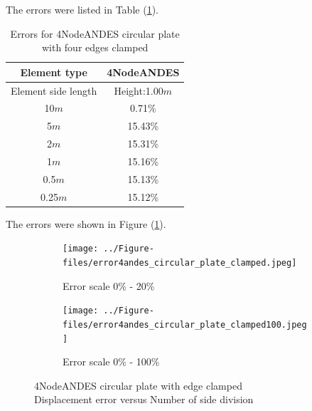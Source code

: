 \documentclass[fleqn,11pt]{article}
\begin{document}
The errors were listed in Table (\ref{table errors for 4NodeANDES circular plate with four edges clamped}).

\begin{table}[H]
  \centering
      \caption{Errors for 4NodeANDES circular plate with four edges clamped}
  \label{table errors for 4NodeANDES circular plate with four edges clamped}
\begin{tabular}{|c|c|}
\hline
Element type     & 4NodeANDES          \\ \hline
Element side length & Height:1.00$m$   \\ \hline
10$m$            & 0.71\%         \\ \hline
5$m$             & 15.43\%        \\ \hline
2$m$             & 15.31\%        \\ \hline
1$m$             & 15.16\%        \\ \hline
0.5$m$           & 15.13\%        \\ \hline
0.25$m$          & 15.12\%       \\
\hline
\end{tabular}
\end{table}



The errors were shown in Figure (\ref{fig 4NodeANDES circular plate with edge clamped}).
\begin{figure}[H]
  \begin{subfigure}{0.5\textwidth}
    \centering
    \texttt{[image: ../Figure-files/error4andes\_circular\_plate\_clamped.jpeg]}
    \caption{Error scale 0\% - 20\%}
  \end{subfigure}
  \begin{subfigure}{0.5\textwidth}
    \centering
    \texttt{[image: ../Figure-files/error4andes\_circular\_plate\_clamped100.jpeg]}
    \caption{Error scale 0\% - 100\%}
  \end{subfigure}
  \captionsetup{justification=centering,margin=3cm}
  \caption{4NodeANDES circular plate with edge clamped\\
      Displacement error   versus   Number of side division}
  \label{fig 4NodeANDES circular plate with edge clamped}
\end{figure}
\end{document}
